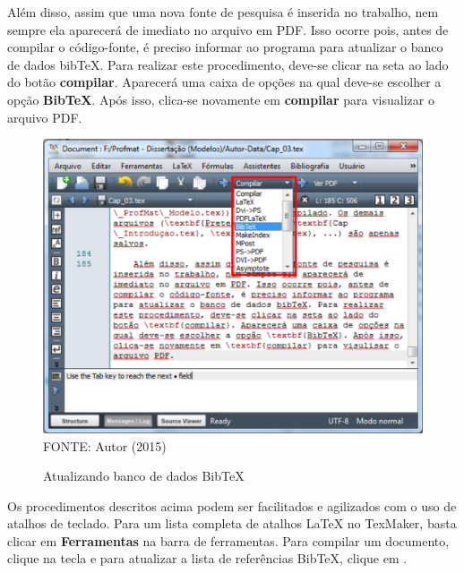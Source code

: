 	Além disso, assim que uma nova fonte de pesquisa é inserida no trabalho, nem sempre ela aparecerá de imediato no arquivo em PDF. Isso ocorre pois, antes de compilar o código-fonte, é preciso informar ao programa para atualizar o banco de dados bibTeX. Para realizar este procedimento, deve-se clicar na seta ao lado do botão \textbf{compilar}. Aparecerá uma caixa de opções na qual deve-se escolher a opção \textbf{BibTeX}. Após isso, clica-se novamente em \textbf{compilar} para visualizar o arquivo PDF.
	\begin{figure}[H]
	\centering
	\caption{Atualizando banco de dados BibTeX}
	\includegraphics[scale=0.25]
	{img/fig19.png}\label{fig19}\\
	FONTE: Autor (2015)
	\end{figure}
	
	Os procedimentos descritos acima podem ser facilitados e agilizados com o uso de atalhos de teclado. Para um lista completa de atalhos LaTeX no TexMaker, basta clicar em \textbf{Ferramentas} na barra de ferramentas. Para compilar um documento, clique na tecla  e para atualizar a lista de referências BibTeX, clique em .
	

